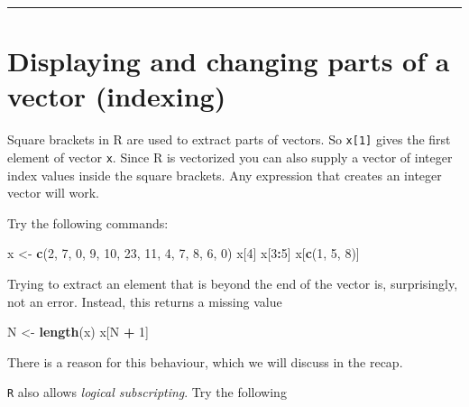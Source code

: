 \documentclass[
]{book}
\newenvironment{Shaded}{\begin{snugshade}}{\end{snugshade}}
\newcommand{\DecValTok}[1]{\textcolor[rgb]{0.00,0.00,0.81}{#1}}
\newcommand{\FunctionTok}[1]{\textcolor[rgb]{0.13,0.29,0.53}{\textbf{#1}}}
\newcommand{\NormalTok}[1]{#1}
\newcommand{\OtherTok}[1]{\textcolor[rgb]{0.56,0.35,0.01}{#1}}
\newcommand{\SpecialCharTok}[1]{\textcolor[rgb]{0.81,0.36,0.00}{\textbf{#1}}}
\begin{document}
\begin{center}\rule{0.5\linewidth}{0.5pt}\end{center}

\section{Displaying and changing parts of a vector (indexing)}\label{displaying-and-changing-parts-of-a-vector-indexing}

Square brackets in R are used to extract parts of vectors. So
\texttt{x{[}1{]}} gives the first element of vector \texttt{x}. Since R is
vectorized you can also supply a vector of integer index values inside
the square brackets. Any expression that creates an integer vector
will work.

Try the following commands:

\begin{Shaded}
\begin{Highlighting}[]
\NormalTok{x }\OtherTok{\textless{}{-}} \FunctionTok{c}\NormalTok{(}\DecValTok{2}\NormalTok{, }\DecValTok{7}\NormalTok{, }\DecValTok{0}\NormalTok{, }\DecValTok{9}\NormalTok{, }\DecValTok{10}\NormalTok{, }\DecValTok{23}\NormalTok{, }\DecValTok{11}\NormalTok{, }\DecValTok{4}\NormalTok{, }\DecValTok{7}\NormalTok{, }\DecValTok{8}\NormalTok{, }\DecValTok{6}\NormalTok{, }\DecValTok{0}\NormalTok{)}
\NormalTok{x[}\DecValTok{4}\NormalTok{]}
\NormalTok{x[}\DecValTok{3}\SpecialCharTok{:}\DecValTok{5}\NormalTok{]}
\NormalTok{x[}\FunctionTok{c}\NormalTok{(}\DecValTok{1}\NormalTok{, }\DecValTok{5}\NormalTok{, }\DecValTok{8}\NormalTok{)]}
\end{Highlighting}
\end{Shaded}

Trying to extract an element that is beyond the end of the vector is,
surprisingly, not an error. Instead, this returns a missing value

\begin{Shaded}
\begin{Highlighting}[]
\NormalTok{N }\OtherTok{\textless{}{-}} \FunctionTok{length}\NormalTok{(x)}
\NormalTok{x[N }\SpecialCharTok{+} \DecValTok{1}\NormalTok{]}
\end{Highlighting}
\end{Shaded}

There is a reason for this behaviour, which we will discuss in the recap.

\texttt{R} also allows \emph{logical subscripting}. Try the following
\end{document}
